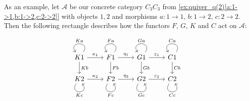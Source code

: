 
\begin{example}

As an example, let $\mathcal{A}$ be our concrete category $C_{3}C_{3}$ from \ref{ex:quiver_q(2)[a:1->1,b:1->2,c:2->2]}
with objects $1,2$ and morphisms
$a : 1\rightarrow 1,\, b : 1 \rightarrow 2,\, c : 2 \rightarrow 2$. Then the following rectangle describes how the functors $F$, $G$, $K$ and $C$
act on $\mathcal{A}$:

\[
\begin{tikzcd}
K1 \arrow["Ka"', loop, distance=2em, in=125, out=55] \arrow[d, "Kb"] \arrow[r, "\kappa_{1}"] & F1 \arrow["Fa"', loop, distance=2em, in=125, out=55] \arrow[d, "Fb"] \arrow[r, "\eta_{1}"] & G1 \arrow["Ga"', loop, distance=2em, in=125, out=55] \arrow[d, "Gb"] \arrow[r, "\varepsilon_{1}"] & C1 \arrow[d, "Cb"] \arrow["Ca"', loop, distance=2em, in=125, out=55] \\
K2 \arrow["Kc"', loop, distance=2em, in=305, out=235] \arrow[r, "\kappa_{2}"]                & F2 \arrow["Fc"', loop, distance=2em, in=305, out=235] \arrow[r, "\eta_{2}"]                & G2 \arrow["Gc"', loop, distance=2em, in=305, out=235] \arrow[r, "\varepsilon_{2}"]                & C2 \arrow["Cc"', loop, distance=2em, in=305, out=235]               
\end{tikzcd}
\]


\end{example}
